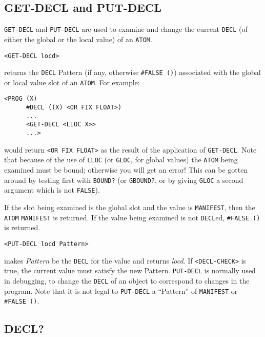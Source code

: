 \documentclass[a4paper]{scrbook}
\begin{document}
\subsection{GET-DECL and PUT-DECL}\label{get-decl-and-put-decl}

\texttt{GET-DECL} and \texttt{PUT-DECL} are used to examine
and change the current \texttt{DECL} (of either the global or the local value) of an \texttt{ATOM}.

\begin{verbatim}
<GET-DECL locd>
\end{verbatim}

returns the \texttt{DECL} Pattern (if any, otherwise \texttt{\#FALSE\ ()}) associated with the global or local value slot
of an \texttt{ATOM}. For example:

\begin{verbatim}
<PROG (X)
      #DECL ((X) <OR FIX FLOAT>)
      ...
      <GET-DECL <LLOC X>>
      ...>
\end{verbatim}

would return \texttt{\textless{}OR\ FIX\ FLOAT\textgreater{}} as the result of the application of \texttt{GET-DECL}. Note
that because of the use of \texttt{LLOC} (or \texttt{GLOC}, for global values) the \texttt{ATOM} being examined must be
bound; otherwise you will get an error! This can be gotten around by testing first with \texttt{BOUND?} (or
\texttt{GBOUND?}, or by giving \texttt{GLOC} a second argument which is not \texttt{FALSE}).

If the slot being examined is the global slot and the value is \texttt{MANIFEST}, then the \texttt{ATOM} \texttt{MANIFEST}
is returned. If the value being examined is not \texttt{DECL}ed, \texttt{\#FALSE\ ()} is returned.

\begin{verbatim}
<PUT-DECL locd Pattern>
\end{verbatim}

makes \emph{Pattern} be the \texttt{DECL} for the value and returns \emph{locd}. If
\texttt{\textless{}DECL-CHECK\textgreater{}} is true, the current value must satisfy the new Pattern. \texttt{PUT-DECL} is
normally used in debugging, to change the \texttt{DECL} of an object to correspond to changes in the program. Note that it
is not legal to \texttt{PUT-DECL} a ``Pattern'' of \texttt{MANIFEST} or \texttt{\#FALSE\ ()}.

\subsection{DECL?}\label{decl}
\end{document}
